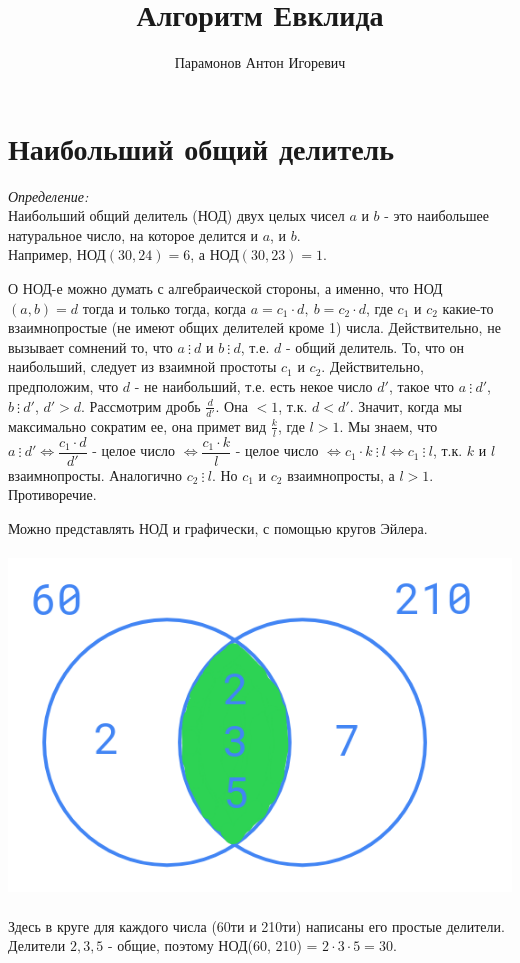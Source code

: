 \documentclass[12pt]{article} %
\begin{document}
\title{Алгоритм Евклида}
\author{Парамонов Антон Игоревич}
\date{}
\maketitle
\section{Наибольший общий делитель}
\begin{tcolorbox}[colback=white, colframe=black]
	\textit{Определение:}\\
	Наибольший общий делитель (НОД) двух целых чисел $a$ и $b$ - это наибольшее натуральное число, на которое делится и $a$, и $b$.\\
	Например, $\mathrm{\text{НОД}}(30, 24) = 6$, а $\mathrm{\text{НОД}}(30, 23) = 1$.
\end{tcolorbox}
О НОД-е можно думать с алгебраической стороны, а именно, что НОД$(a, b) = d$ тогда и только тогда, когда $a = c_1\cdot d,\ b = c_2\cdot d$, где $c_1$ и $c_2$ какие-то взаимнопростые (не имеют общих делителей кроме 1) числа. Действительно, не вызывает сомнений то, что $a\ \vdots\ d$ и $b\ \vdots\ d$, т.е. $d$ - общий делитель. То, что он наибольший, следует из взаимной простоты $c_1$ и $c_2$. Действительно, предположим, что $d$ - не наибольший, т.е. есть некое число $d'$, такое что $a\ \vdots\ d'$, $b\ \vdots\ d'$, $d' > d$. Рассмотрим дробь $\frac{d}{d'}$. Она $ < 1$, т.к. $d < d'$. Значит, когда мы максимально сократим ее, она примет вид $\frac{k}{l}$, где $l > 1$. Мы знаем, что $a\ \vdots\ d' \Leftrightarrow \dfrac{c_1 \cdot d}{d'}$ - целое число $\Leftrightarrow \dfrac{c_1 \cdot k}{l}$ - целое число $\Leftrightarrow c_1 \cdot k\ \vdots\ l \Leftrightarrow c_1\ \vdots\ l$, т.к. $k$ и $l$ взаимнопросты. Аналогично $c_2\ \vdots\ l$. Но $c_1$ и $c_2$ взаимнопросты, а $l > 1$. Противоречие.
\newpage

Можно представлять НОД и графически, с помощью кругов Эйлера.\\
\\
\includegraphics[scale=0.6]{gcd.png}\\
\\
Здесь в круге для каждого числа (60ти и 210ти) написаны его простые делители. Делители $2, 3, 5$ - общие, поэтому НОД(60, 210) = $2\cdot3\cdot5 = 30$.\\
\end{document}
